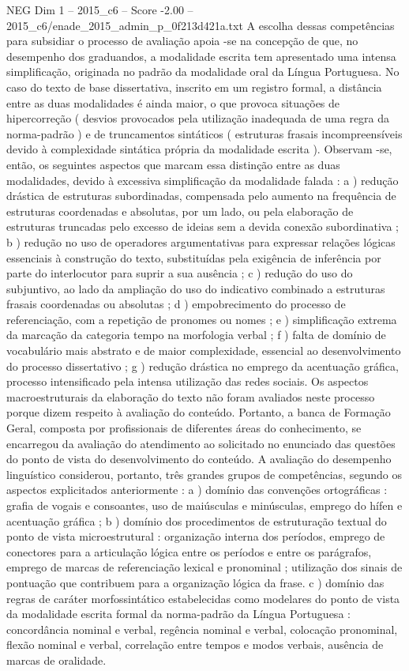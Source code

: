 \begin{textsample}{NEG Dim 1 – 2015\_c6 – Score -2.00 – 2015\_c6/enade\_2015\_admin\_p\_0f213d421a.txt}
A escolha dessas competências para subsidiar o processo de avaliação apoia -se na concepção de que, no desempenho dos graduandos, a modalidade escrita tem apresentado uma intensa simplificação, originada no padrão da modalidade oral da Língua Portuguesa.
No caso do texto de base dissertativa, inscrito em um registro formal, a distância entre as duas modalidades é ainda maior, o que provoca situações de hipercorreção ( desvios provocados pela utilização inadequada de uma regra da norma-padrão ) e de truncamentos sintáticos ( estruturas frasais incompreensíveis devido à complexidade sintática própria da modalidade escrita ).
Observam -se, então, os seguintes aspectos que marcam essa distinção entre as duas modalidades, devido à excessiva simplificação da modalidade falada : a ) redução drástica de estruturas subordinadas, compensada pelo aumento na frequência de estruturas coordenadas e absolutas, por um lado, ou pela elaboração de estruturas truncadas pelo excesso de ideias sem a devida conexão subordinativa ; b ) redução no uso de operadores argumentativas para expressar relações lógicas essenciais à construção do texto, substituídas pela exigência de inferência por parte do interlocutor para suprir a sua ausência ; c ) redução do uso do subjuntivo, ao lado da ampliação do uso do indicativo combinado a estruturas frasais coordenadas ou absolutas ; d ) empobrecimento do processo de referenciação, com a repetição de pronomes ou nomes ; e ) simplificação extrema da marcação da categoria tempo na morfologia verbal ; f ) falta de domínio de vocabulário mais abstrato e de maior complexidade, essencial ao desenvolvimento do processo dissertativo ; g ) redução drástica no emprego da acentuação gráfica, processo intensificado pela intensa utilização das redes sociais.
Os aspectos macroestruturais da elaboração do texto não foram avaliados neste processo porque dizem respeito à avaliação do conteúdo.
Portanto, a banca de Formação Geral, composta por profissionais de diferentes áreas do conhecimento, se encarregou da avaliação do atendimento ao solicitado no enunciado das questões do ponto de vista do desenvolvimento do conteúdo.
A avaliação do desempenho linguístico considerou, portanto, três grandes grupos de competências, segundo os aspectos explicitados anteriormente : a ) domínio das convenções ortográficas : grafia de vogais e consoantes, uso de maiúsculas e minúsculas, emprego do hífen e acentuação gráfica ; b ) domínio dos procedimentos de estruturação textual do ponto de vista microestrutural : organização interna dos períodos, emprego de conectores para a articulação lógica entre os períodos e entre os parágrafos, emprego de marcas de referenciação lexical e pronominal ; utilização dos sinais de pontuação que contribuem para a organização lógica da frase. c ) domínio das regras de caráter morfossintático estabelecidas como modelares do ponto de vista da modalidade escrita formal da norma-padrão da Língua Portuguesa : concordância nominal e verbal, regência nominal e verbal, colocação pronominal, flexão nominal e verbal, correlação entre tempos e modos verbais, ausência de marcas de oralidade.

\end{textsample}
